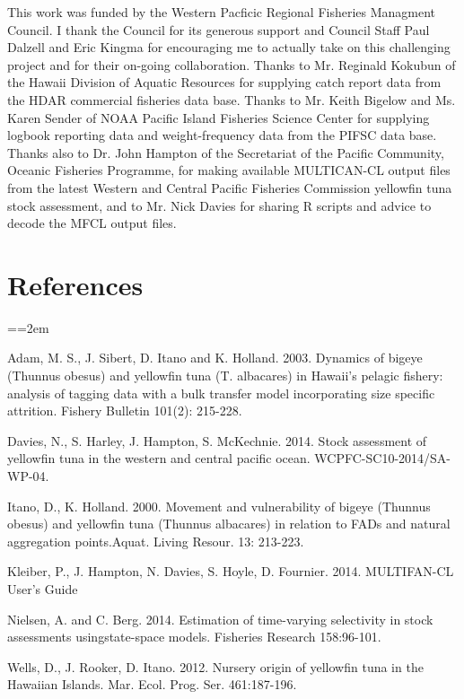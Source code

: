 \documentclass[12pt,letterpaper]{article}
\newcommand\doublespacing{\baselineskip=1.6\normalbaselineskip}
\begin{document}
\par
{}
This work was funded by the Western Pacficic Regional Fisheries
Managment Council. I thank the Council for its generous support and
Council Staff Paul Dalzell and Eric Kingma for encouraging me to
actually take on this challenging project and for their on-going
collaboration.
Thanks to Mr. Reginald Kokubun of the Hawaii Division of Aquatic
Resources for supplying catch report data from the HDAR commercial
fisheries data base.
Thanks to Mr. Keith Bigelow and Ms. Karen Sender of NOAA Pacific
Island Fisheries Science Center for supplying logbook reporting data and
weight-frequency data from the PIFSC data base.
Thanks also to Dr. John Hampton of the Secretariat of the Pacific
Community, Oceanic Fisheries Programme, for making available
MULTICAN-CL output files from the latest Western and Central Pacific
Fisheries Commission yellowfin tuna stock assessment, and to Mr. Nick
Davies for sharing R scripts and advice to decode the MFCL output files.

\section*{References}
{\parindent=0cm \small
\everypar={\hangindent=2em }\par
\doublespacing
Adam, M. S., J. Sibert, D. Itano and K. Holland. 2003. Dynamics of
bigeye (Thunnus obesus) and yellowfin tuna (T. albacares) in Hawaii's
pelagic fishery: analysis of tagging data with a bulk transfer model
incorporating size specific attrition. Fishery Bulletin 101(2):
215-228.

Davies, N., S. Harley, J. Hampton, S. McKechnie. 2014. Stock
assessment of yellowfin tuna in the western and central pacific ocean.
WCPFC-SC10-2014/SA-WP-04.

Itano, D., K. Holland. 2000.  Movement and vulnerability of bigeye
(Thunnus obesus) and yellowfin tuna (Thunnus albacares) in relation to
FADs and natural aggregation points.Aquat. Living Resour. 13: 213-223.

Kleiber, P., J. Hampton, N. Davies, S. Hoyle, D. Fournier. 2014.
MULTIFAN-CL User’s Guide

Nielsen, A. and C. Berg. 2014. Estimation of time-varying selectivity
in stock assessments usingstate-space models. Fisheries Research
158:96-101.

Wells, D., J. Rooker, D. Itano. 2012.  Nursery origin of yellowfin
tuna in the Hawaiian Islands. Mar. Ecol. Prog. Ser. 461:187-196. 
\par}

\end{document}
